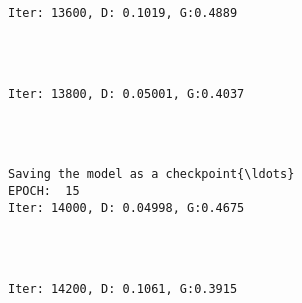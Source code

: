 \documentclass[11pt]{article}
\begin{document}
    \begin{Verbatim}[commandchars=\\\{\}]

Iter: 13600, D: 0.1019, G:0.4889
    \end{Verbatim}

    \begin{center}
    \end{center}
    { \hspace*{\fill} \\}
    
    \begin{Verbatim}[commandchars=\\\{\}]

Iter: 13800, D: 0.05001, G:0.4037
    \end{Verbatim}

    \begin{center}
    \end{center}
    { \hspace*{\fill} \\}
    
    \begin{Verbatim}[commandchars=\\\{\}]

Saving the model as a checkpoint{\ldots}
EPOCH:  15
Iter: 14000, D: 0.04998, G:0.4675
    \end{Verbatim}

    \begin{center}
    \end{center}
    { \hspace*{\fill} \\}
    
    \begin{Verbatim}[commandchars=\\\{\}]

Iter: 14200, D: 0.1061, G:0.3915
    \end{Verbatim}

    \begin{center}
    \end{center}
    { \hspace*{\fill} \\}
    
\end{document}
